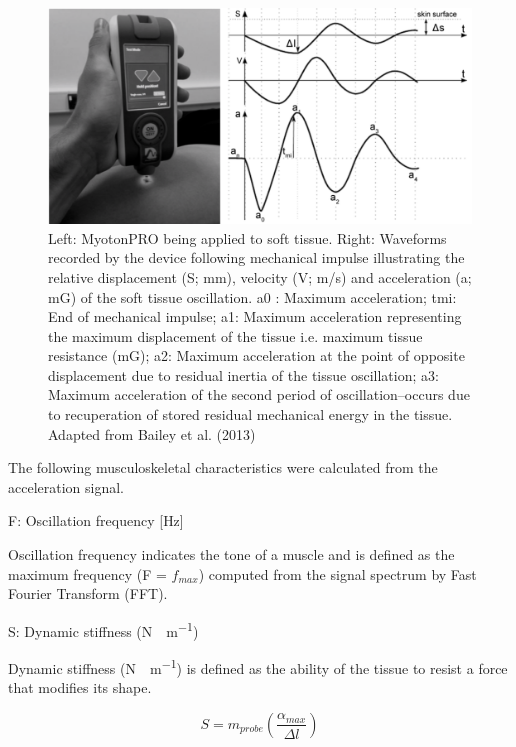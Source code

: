 \documentclass[
  english,
  man,floatsintext]{apa6}
\begin{document}
\begin{figure}[H]

{\centering \includegraphics[width=1\linewidth]{figs/measures/myotonbigexample} 

}

\caption{Left: MyotonPRO being applied to soft tissue. Right: Waveforms recorded by the device following mechanical impulse illustrating the relative displacement (S; mm), velocity (V; m/s) and acceleration (a; mG) of the soft tissue oscillation. a0 : Maximum acceleration; tmi: End of mechanical impulse; a1: Maximum acceleration representing the maximum displacement of the tissue i.e. maximum tissue resistance (mG); a2: Maximum acceleration at the point of opposite displacement due to residual inertia of the tissue oscillation; a3: Maximum acceleration of the second period of oscillation–occurs due to recuperation of stored residual mechanical energy in the tissue. Adapted from Bailey et al. (2013)}\label{fig:myotonpro}
\end{figure}

\noindent The following musculoskeletal characteristics were calculated from the acceleration signal.

\noindent F: Oscillation frequency {[}Hz{]}

\noindent Oscillation frequency indicates the tone of a muscle and is defined as the maximum frequency (F = \(f_{max}\)) computed from the signal spectrum by Fast Fourier Transform (FFT).

\noindent S: Dynamic stiffness (\si{N\cdot m^{-1}})

\noindent Dynamic stiffness (\si{N \cdot m^{-1}}) is defined as the ability of the tissue to resist a force that modifies its shape.

\begin{equation} 
  S = m_{probe} \left(\frac{\alpha_{max}} {\Delta l}\right)
  \label{eq:stiffness}
\end{equation}
\end{document}

